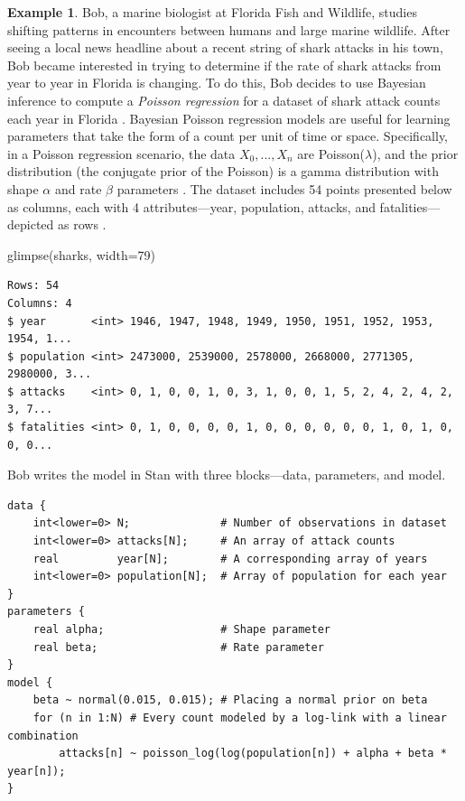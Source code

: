 \documentclass[
  12pt,
  oneside]{book}
\newenvironment{Shaded}{\begin{snugshade}}{\end{snugshade}}
\newcommand{\AttributeTok}[1]{\textcolor[rgb]{0.77,0.63,0.00}{#1}}
\newcommand{\DecValTok}[1]{\textcolor[rgb]{0.00,0.00,0.81}{#1}}
\newcommand{\FunctionTok}[1]{\textcolor[rgb]{0.00,0.00,0.00}{#1}}
\newcommand{\NormalTok}[1]{#1}
\theoremstyle{definition}
\theoremstyle{definition}
\newtheorem{example}{Example}[chapter]
\theoremstyle{definition}
\theoremstyle{remark}
\begin{document}
\begin{example}
\protect\hypertarget{exm:stan}{}{\label{exm:stan} }Bob, a marine biologist at Florida Fish and Wildlife, studies shifting patterns in encounters between humans and large marine wildlife.
After seeing a local news headline about a recent string of shark attacks in his town, Bob became interested in trying to determine if the rate of shark attacks from year to year in Florida is changing. To do this, Bob decides to use Bayesian inference to compute a \emph{Poisson regression} for a dataset of shark attack counts each year in Florida \citep{Collier2018}. Bayesian Poisson regression models are useful for learning parameters that take the form of a count per unit of time or space. Specifically, in a Poisson regression scenario, the data \(X_0,...,X_n\) are Poisson(\(\lambda\)), and the prior distribution (the conjugate prior of the Poisson) is a gamma distribution with shape \(\alpha\) and rate \(\beta\) parameters \citep{Hitchcock2014}. The dataset includes 54 points presented below as columns, each with 4 attributes---year, population, attacks, and fatalities---depicted as rows \citep{Simonoff2003}.
\end{example}

\begin{Shaded}
\begin{Highlighting}[]
\FunctionTok{glimpse}\NormalTok{(sharks, }\AttributeTok{width=}\DecValTok{79}\NormalTok{)}
\end{Highlighting}
\end{Shaded}

\begin{verbatim}
Rows: 54
Columns: 4
$ year       <int> 1946, 1947, 1948, 1949, 1950, 1951, 1952, 1953, 1954, 1...
$ population <int> 2473000, 2539000, 2578000, 2668000, 2771305, 2980000, 3...
$ attacks    <int> 0, 1, 0, 0, 1, 0, 3, 1, 0, 0, 1, 5, 2, 4, 2, 4, 2, 3, 7...
$ fatalities <int> 0, 1, 0, 0, 0, 0, 1, 0, 0, 0, 0, 0, 0, 1, 0, 1, 0, 0, 0...
\end{verbatim}

Bob writes the model in Stan with three blocks---data, parameters, and model.

\begin{verbatim}
data {
    int<lower=0> N;              # Number of observations in dataset
    int<lower=0> attacks[N];     # An array of attack counts
    real         year[N];        # A corresponding array of years
    int<lower=0> population[N];  # Array of population for each year
}
parameters {
    real alpha;                  # Shape parameter
    real beta;                   # Rate parameter
}                  
model {
    beta ~ normal(0.015, 0.015); # Placing a normal prior on beta
    for (n in 1:N) # Every count modeled by a log-link with a linear combination
        attacks[n] ~ poisson_log(log(population[n]) + alpha + beta * year[n]);
}
\end{verbatim}
\end{document}
